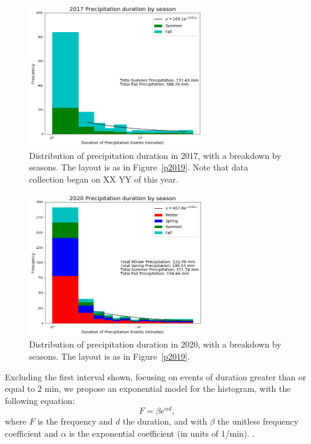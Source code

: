 \documentclass[11pt]{report}
\begin{document}
\clearpage
\begin{figure}[t]
	\centering
	\includegraphics[width=0.675\textwidth]{Figures/precip_2017.png}
	\caption[Precipitation histogram for 2017 broken down by
          season]{\label{p2017} Distribution of precipitation duration
          in 2017, with a breakdown by seasons. The layout is as in
          Figure~\ref{p2019}. Note that data collection began on XX YY
          of this year.}
\end{figure}
\begin{figure}[b]
	\centering
	\includegraphics[width=0.675\textwidth]{Figures/precip_2020.png}
	\caption[Precipitation histogram for 2020 broken down by season]{\label{p2020}
		Distribution of precipitation duration in 2020, with a breakdown
		by seasons. The layout is as in Figure~\ref{p2019}.}
\end{figure}

\clearpage
Excluding the first interval shown, focusing on events of duration
greater than or equal to 2 min, we propose an exponential model for
the histogram, with the following equation:
\begin{equation}
  F = \beta e^{\alpha d}
,
\end{equation}
where $F$ is the frequency and $d$ the duration, and with $\beta$ the
unitless frequency coefficient and $\alpha$ is the exponential
coefficient (in units of 1/min). .
	
\end{document}
